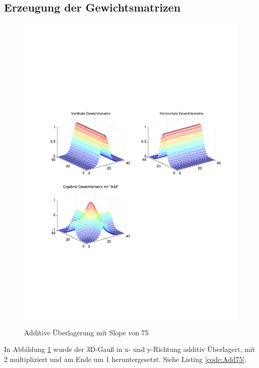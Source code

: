\subsection{Erzeugung der Gewichtsmatrizen \label{eGeW}} 
\begin{figure}[hbt]
	\centering
	\includegraphics[trim=70 211 42 242, clip, width=\linewidth]{./Bilder/Auswertung/GewichtmatrixEinzelschritte/Endergebnis_Gewichtsmatrix_Slope_75_Type_Add}
	\caption{Additive Überlagerung mit Slope von 75}
	\label{Add75}
\end{figure}
In Abbildung \ref{Add75} wurde der 3D-Gauß in x- und y-Richtung additiv Überlagert, mit 2 multipliziert und am Ende um 1 heruntergesetzt. Siehe Listing \ref{code:Add75}.
 \label{code:Add75}


